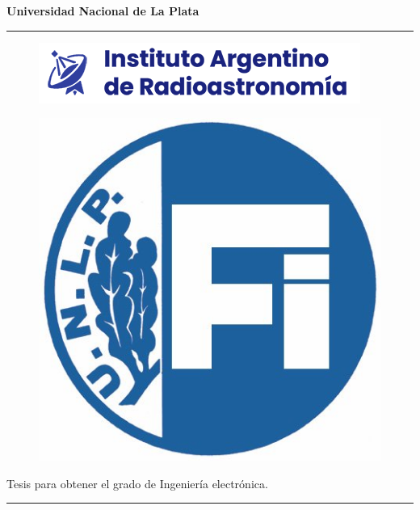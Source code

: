 \graphicspath{{portada}}
\begin{titlepage} 
	\begin{center}
{
 \bf{\fontsize{20}{0}\selectfont Universidad Nacional de La Plata }\\[-5mm]
 \rule[-2mm]{1\linewidth}{1mm}	
}
\end{center}
\vspace{-5mm}
\begin{figure}[ht!]
	\centering
	\includegraphics{portada/Iar-copia} 
\end{figure}

\vspace{-5mm}
\begin{figure}[ht!]
\centering
\includegraphics[scale=0.7]{portada/fac_ingenieria}
\end{figure}
 
{
 \centering
 \textbf{\fontsize{20}{0}{\selectfont{Facultad de ingeniería}}}
 \vspace{-5mm}
 \begin{center}
 	\Large Tesis para obtener el grado de Ingeniería electrónica.
 \end{center}
}
\vspace{-4mm}
\rule{1\linewidth}{1mm} 


\end{titlepage}
